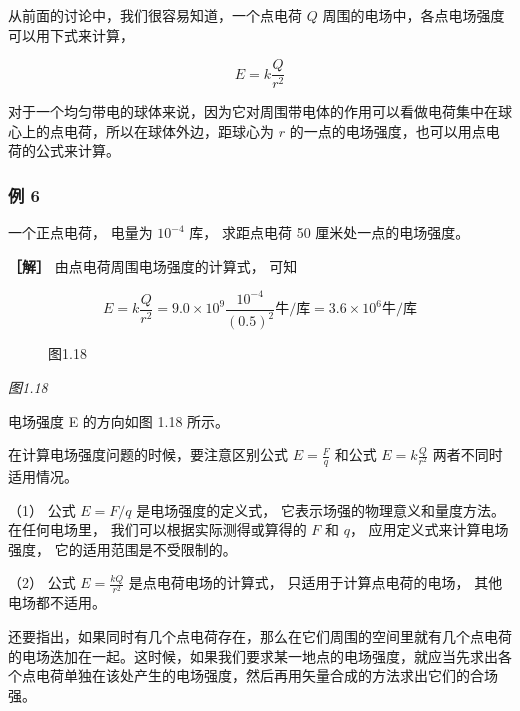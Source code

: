 从前面的讨论中，我们很容易知道，一个点电荷 \(Q\)
周围的电场中，各点电场强度可以用下式来计算，

\[
E = k \frac{Q}{r^{2}} \tag{1.3}
\]

对于一个均匀带电的球体来说，因为它对周围带电体的作用可以看做电荷集中在球心上的点电荷，所以在球体外边，距球心为
\(r\) 的一点的电场强度，也可以用点电荷的公式来计算。

\subsubsection{例 6}\label{ux4f8b-6}

一个正点电荷， 电量为 \(10^{-4}\) 库， 求距点电荷 50
厘米处一点的电场强度。

\textbf{［解］} 由点电荷周围电场强度的计算式， 可知

\[
E = k \frac{Q}{r^{2}} = 9.0 \times 10^{9} \frac{10^{- 4}}{(0.5)^{2}} \text{牛/库} = 3.6 \times 10^{6} \text{牛/库}
\]

\begin{figure}
\centering
{}
\caption{图1.18}
\end{figure}

\emph{图1.18}

电场强度 E 的方向如图 1.18 所示。

在计算电场强度问题的时候，要注意区别公式 \(E=\frac{F}{q}\) 和公式
\(E=k\frac{Q}{r^{2}}\) 两者不同时适用情况。

（1） 公式 \(E = F / q\) 是电场强度的定义式，
它表示场强的物理意义和量度方法。 在任何电场里，
我们可以根据实际测得或算得的 \(F\) 和 \(q\)， 应用定义式来计算电场强度，
它的适用范围是不受限制的。

（2） 公式 \(E = \frac{kQ}{r^2}\) 是点电荷电场的计算式，
只适用于计算点电荷的电场， 其他电场都不适用。

还要指出，如果同时有几个点电荷存在，那么在它们周围的空间里就有几个点电荷的电场迭加在一起。这时候，如果我们要求某一地点的电场强度，就应当先求出各个点电荷单独在该处产生的电场强度，然后再用矢量合成的方法求出它们的合场强。

